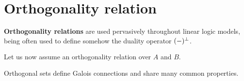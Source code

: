 \section{Orthogonality relation}\label{orthogonality-relation}

\textbf{Orthogonality relations} are used pervasively throughout linear
logic models, being often used to define somehow the duality operator
\((-)^\bot\).

Let us now assume an orthogonality relation over \(A\) and \(B\).

Orthogonal sets define Galois connections and share many common
properties.

